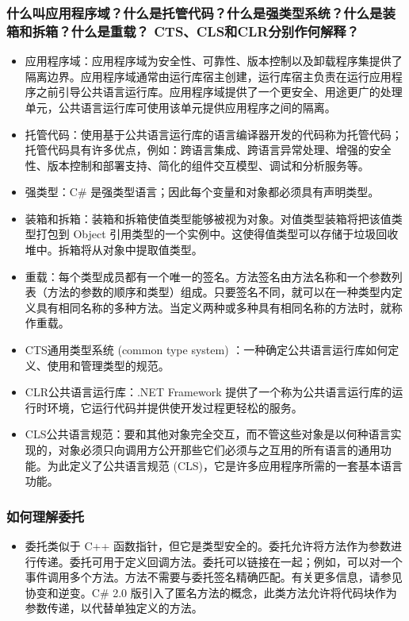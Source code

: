 \documentclass[9pt, b5paper]{article}
\begin{document}
\subsubsection{什么叫应用程序域？什么是托管代码？什么是强类型系统？什么是装箱和拆箱？什么是重载？ CTS、CLS和CLR分别作何解释？}
\label{sec-1-2-112}
\begin{itemize}
\item 应用程序域：应用程序域为安全性、可靠性、版本控制以及卸载程序集提供了隔离边界。应用程序域通常由运行库宿主创建，运行库宿主负责在运行应用程序之前引导公共语言运行库。应用程序域提供了一个更安全、用途更广的处理单元，公共语言运行库可使用该单元提供应用程序之间的隔离。
\item 托管代码：使用基于公共语言运行库的语言编译器开发的代码称为托管代码；托管代码具有许多优点，例如：跨语言集成、跨语言异常处理、增强的安全性、版本控制和部署支持、简化的组件交互模型、调试和分析服务等。
\item 强类型：C\# 是强类型语言；因此每个变量和对象都必须具有声明类型。
\item 装箱和拆箱：装箱和拆箱使值类型能够被视为对象。对值类型装箱将把该值类型打包到 Object 引用类型的一个实例中。这使得值类型可以存储于垃圾回收堆中。拆箱将从对象中提取值类型。
\item 重载：每个类型成员都有一个唯一的签名。方法签名由方法名称和一个参数列表（方法的参数的顺序和类型）组成。只要签名不同，就可以在一种类型内定义具有相同名称的多种方法。当定义两种或多种具有相同名称的方法时，就称作重载。
\item CTS通用类型系统 (common type system) ：一种确定公共语言运行库如何定义、使用和管理类型的规范。
\item CLR公共语言运行库：.NET Framework 提供了一个称为公共语言运行库的运行时环境，它运行代码并提供使开发过程更轻松的服务。
\item CLS公共语言规范：要和其他对象完全交互，而不管这些对象是以何种语言实现的，对象必须只向调用方公开那些它们必须与之互用的所有语言的通用功能。为此定义了公共语言规范 (CLS)，它是许多应用程序所需的一套基本语言功能。
\end{itemize}
\subsubsection{如何理解委托}
\label{sec-1-2-113}
\begin{itemize}
\item 委托类似于 C++ 函数指针，但它是类型安全的。委托允许将方法作为参数进行传递。委托可用于定义回调方法。委托可以链接在一起；例如，可以对一个事件调用多个方法。方法不需要与委托签名精确匹配。有关更多信息，请参见协变和逆变。C\# 2.0 版引入了匿名方法的概念，此类方法允许将代码块作为参数传递，以代替单独定义的方法。
\end{itemize}
\end{document}
